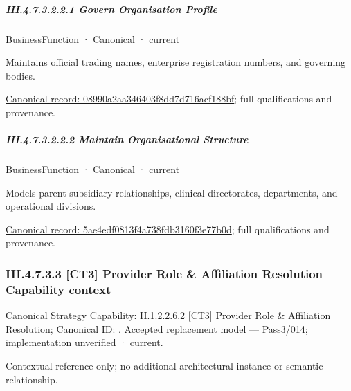 \subparagraph*{III.4.7.3.2.2.1 Govern Organisation Profile}
\label{navigation:III.4.7.3.2.2.1}

\label{element:08990a2aa346403f8dd7d716acf188bf}
{\small BusinessFunction · Canonical · current}\par

Maintains official trading names, enterprise registration numbers, and governing bodies.


{\footnotesize \href{../../../../../../../continuum/business/business-function/08990a2aa346403f8dd7d716acf188bf.md}{Canonical record: 08990a2aa346403f8dd7d716acf188bf}; full qualifications and provenance.}\par
\subparagraph*{III.4.7.3.2.2.2 Maintain Organisational Structure}
\label{navigation:III.4.7.3.2.2.2}

\label{element:5ae4edf0813f4a738fdb3160f3e77b0d}
{\small BusinessFunction · Canonical · current}\par

Models parent-subsidiary relationships, clinical directorates, departments, and operational divisions.


{\footnotesize \href{../../../../../../../continuum/business/business-function/5ae4edf0813f4a738fdb3160f3e77b0d.md}{Canonical record: 5ae4edf0813f4a738fdb3160f3e77b0d}; full qualifications and provenance.}\par
\subsubsection*{III.4.7.3.3 [CT3] Provider Role \& Affiliation Resolution — Capability context}
\label{navigation:III.4.7.3.3}

{\small Canonical Strategy Capability: II.1.2.2.6.2 \hyperref[element:dd0d16f6e6b9491c85deea915bb7bf4d]{[CT3] Provider Role \& Affiliation Resolution}; Canonical ID: \texttt{}. Accepted replacement model — Pass3/014; implementation unverified · current.}\par
Contextual reference only; no additional architectural instance or semantic relationship.\par
